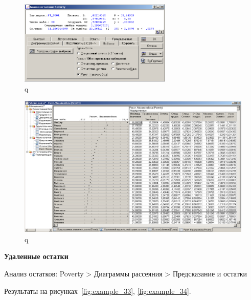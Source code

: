 \begin{figure}[!h]
  \centering

  \includegraphics[height=4cm]
  {inc/example_31.PNG}

  \caption{q}

  \label{fig:example_31}
\end{figure}

\begin{figure}[!h]
  \centering

  \includegraphics[width=13cm]
  {inc/example_32.PNG}

  \caption{q}

  \label{fig:example_32}
\end{figure}

\newpage

\textbf{Удаленные остатки}

Анализ остатков: Poverty > Диаграммы рассеяния >  Предсказание и остатки

Результаты на рисунках~\ref{fig:example_33}, \ref{fig:example_34}.

